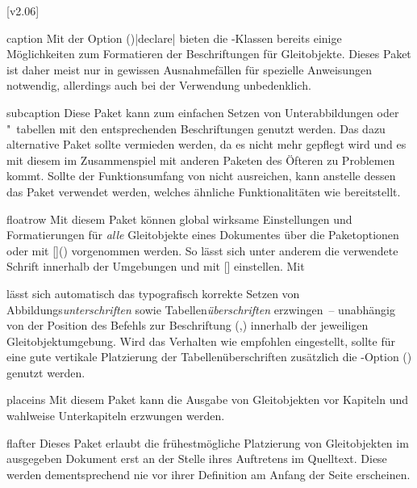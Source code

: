 [v2.06]
%
%
\begin{packages}
\item[caption]
  Mit der Option ()|declare| bieten 
  die \KOMAScript-Klassen bereits einige Möglichkeiten zum Formatieren der 
  Beschriftungen für Gleitobjekte. Dieses Paket ist daher meist nur in gewissen 
  Ausnahmefällen für spezielle Anweisungen notwendig, allerdings auch bei der 
  Verwendung unbedenklich.
\item[subcaption]
  Diese Paket kann zum einfachen Setzen von Unterabbildungen oder "~tabellen 
  mit den entsprechenden Beschriftungen genutzt werden. Das dazu alternative 
  Paket  sollte vermieden werden, da es nicht mehr gepflegt 
  wird und es mit diesem im Zusammenspiel mit anderen Paketen des Öfteren zu 
  Problemen kommt. Sollte der Funktionsumfang von  nicht 
  ausreichen, kann anstelle dessen das Paket  verwendet 
  werden, welches ähnliche Funktionalitäten wie  bereitstellt.
\item[floatrow]
  Mit diesem Paket können global wirksame Einstellungen und Formatierungen für 
  \emph{alle} Gleitobjekte eines Dokumentes über die Paketoptionen oder mit 
  [\PParameter{\dots}]() vorgenommen 
  werden. So lässt sich unter anderem die verwendete Schrift innerhalb der 
  Umgebungen  und  mit
  [] einstellen. Mit 
  \begin{Code}
  \end{Code}\vspace{-\baselineskip}%
  lässt sich automatisch das typografisch korrekte Setzen von 
  Abbildungs\emph{unterschriften} sowie Tabellen\emph{überschriften} 
  erzwingen~-- unabhängig von der Position des Befehls zur Beschriftung 
  (,) innerhalb der 
  jeweiligen Gleitobjektumgebung. Wird das Verhalten wie empfohlen eingestellt, 
  sollte für eine gute vertikale Platzierung der Tabellenüberschriften 
  zusätzlich die \KOMAScript-Option 
  () genutzt werden.
\item[placeins]
  Mit diesem Paket kann die Ausgabe von Gleitobjekten vor Kapiteln und wahlweise
  Unterkapiteln erzwungen werden.
\item[flafter]
  Dieses Paket erlaubt die frühestmögliche Platzierung von Gleitobjekten im 
  ausgegeben Dokument erst an der Stelle ihres Auftretens im Quelltext. Diese 
  werden dementsprechend nie vor ihrer Definition am Anfang der Seite 
  erscheinen.
\end{packages}
%



